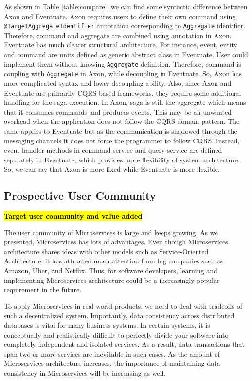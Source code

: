 As shown in Table \ref{table:compare}, we can find some syntactic difference between Axon and Eventuate. Axon requires users to define their own command using \texttt{@TargetAggregateIdentifier} annotation corresponding to \texttt{Aggregate} identifier. Therefore, command and aggregate are combined using annotation in Axon. Eventuate has much clearer structural architecture. For instance, event, entity and command are units defined as generic abstract class in Eventuate. User could implement them without knowing \texttt{Aggregate} definition. Therefore, command is coupling with \texttt{Aggregate} in Axon, while decoupling in Eventuate. So, Axon has more complicated syntax and lower decoupling ability.
Also, since Axon and Eventuate are primarily CQRS based frameworks, they require some additional handling for the saga execution. In Axon, saga is still the aggregate which means that it consumes commands and produces events. This may be an unwanted overhead when the application does not follow the CQRS domain pattern. The same applies to Eventuate but as the communication is shadowed through the messaging channels it does not force the programmer to follow CQRS. Instead, event handler methods in command service and query service are defined separately in Eventuate, which provides more flexibility of system architecture. So, we can say that Axon is more fixed while Eventuate is more flexible.

\subsection{Prospective User Community}
\hl{\textbf{Target user community and value added}}

The user community of Microservices is large and keeps growing. As we presented, Microservices has lots of advantages. Even though Microservices architecture shares ideas with other models such as Service-Oriented Architecture, it has attracted much attention from big companies such as Amazon, Uber, and Netflix. Thus, for software developers, learning and implementing Microservices architecture could be a increasingly popular requirement in the future.

To apply Microservices in real-world products, we need to deal with tradeoffs of such a decentralized system. Importantly, data consistency across distributed databases is vital for many business systems. In certain systems, it is conceptually and realistically difficult to perfectly divide your software into completely independent and isolated services. As a result, data transactions that span two or more services are inevitable in such cases. As the amount of Microservices architecture increases, the importance of maintaining data consistency in Microservices will be increasing as well.

